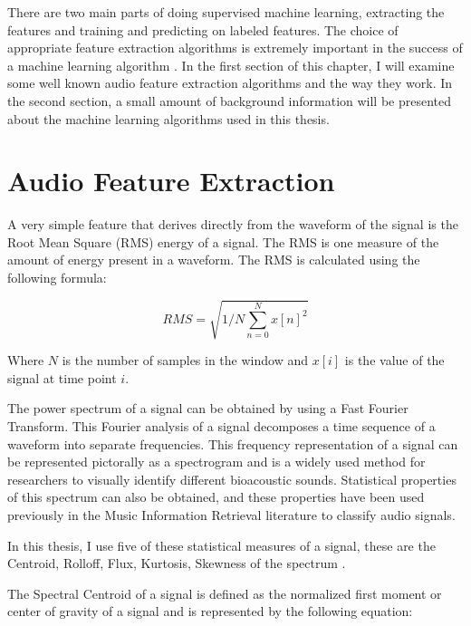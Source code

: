 \documentclass[12pt,oneside]{book}
\begin{document}
\label{chap:analysis}

There are two main parts of doing supervised machine learning,
extracting the features and training and predicting on labeled
features.  The choice of appropriate feature extraction algorithms is
extremely important in the success of a machine learning algorithm
\cite{duda2012pattern}.  In the first section of this chapter, I will
examine some well known audio feature extraction algorithms and the
way they work.  In the second section, a small amount of background
information will be presented about the machine learning algorithms
used in this thesis.

\section{Audio Feature Extraction}


A very simple feature that derives directly from the waveform of the
signal is the Root Mean Square (RMS) energy of a signal.  The RMS is
one measure of the amount of energy present in a waveform.  The RMS is
calculated using the following formula:

\begin{equation} 
RMS =  \sqrt{ 1/N \sum_{n=0}^N x[n]^2 }  
\end{equation}

\noindent Where $N$ is the number of samples in the window and $x[i]$ is the
value of the signal at time point $i$. 

The power spectrum of a signal can be obtained by using a Fast Fourier
Transform.  This Fourier analysis of a signal decomposes a time
sequence of a waveform into separate frequencies.  This frequency
representation of a signal can be represented pictorally as a
spectrogram and is a widely used method for researchers to visually
identify different bioacoustic sounds.  Statistical properties of this
spectrum can also be obtained, and these properties have been used
previously in the Music Information Retrieval literature to classify
audio signals.

In this thesis, I use five of these statistical measures of a signal,
these are the Centroid, Rolloff, Flux, Kurtosis, Skewness of the
spectrum \cite{tzanetakis2008marsyas} \cite{klapuri2006book}.  

The Spectral Centroid of a signal is defined as the normalized first
moment or center of gravity of a signal \cite{li2006intelligent} and is
represented by the following equation:
\end{document}
